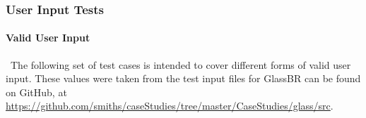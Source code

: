 \documentclass[12pt, titlepage]{article}
\newcommand{\progname}{GlassBR}
\begin{document}
\subsubsection{User Input Tests}

\paragraph{Valid User Input}

~\newline \noindent The following set of test cases is intended to cover 
different forms of valid user input. These values were 
taken from the test input files for \progname{} can be found on GitHub, at 
\href{https://github.com/smiths/caseStudies/tree/master/CaseStudies/glass/src}
{https://github.com/smiths/caseStudies/tree/master/CaseStudies/glass/src}.   
\end{document}
